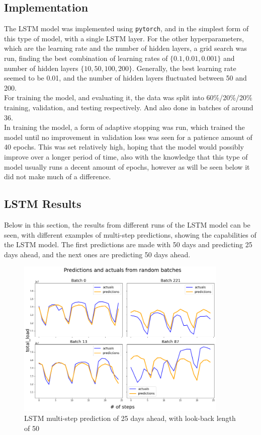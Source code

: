 \documentclass[main.tex]{subfiles}
\begin{document}
\subsection{Implementation}
The LSTM model was implemented using \texttt{pytorch}, and in the simplest form of this type of model, with a single LSTM layer. For the other hyperparameters, which are the learning rate and the number of hidden layers, a grid search was run, finding the best combination of learning rates of $\{0.1,0.01,0.001\}$ and number of hidden layers $\{10,50,100,200\}$. Generally, the best learning rate seemed to be 0.01, and the number of hidden layers fluctuated between 50 and 200.
\\
For training the model, and evaluating it, the data was split into 60\%/20\%/20\% training, validation, and testing respectively. And also done in batches of around 36.\\
In training the model, a form of adaptive stopping was run, which trained the model until no improvement in validation loss was seen for a patience amount of 40 epochs. This was set relatively high, hoping that the model would possibly improve over a longer period of time, also with the knowledge that this type of model usually runs a decent amount of epochs, however as will be seen below it did not make much of a difference.

\subsection{LSTM Results}
Below in this section, the results from different runs of the LSTM model can be seen, with different examples of multi-step predictions, showing the capabilities of the LSTM model. The first predictions are made with 50 days and predicting 25 days ahead, and the next ones are predicting 50 days ahead.

\begin{figure}[H]
\centering
\includegraphics[width=0.9\textwidth]{RNNPlots/lstmpredictionsgood.png}
\caption{LSTM multi-step prediction of 25 days ahead, with look-back length of 50}
\label{fig:lstm_preds_1}
\end{figure}
\end{document}
